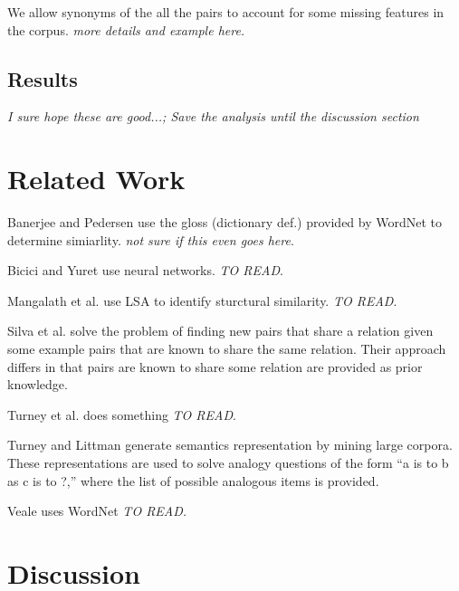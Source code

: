 \documentclass[11pt]{article}
\begin{document}
We allow synonyms of the all the pairs to account for some missing features in
the corpus.  \emph{more details and example here.}

\subsection{Results}

\emph{I sure hope these are good...; Save the analysis until the discussion
  section}

\section{Related Work}

Banerjee and Pedersen\cite{banerjee03extendedgloss} use the gloss (dictionary
def.) provided by WordNet to determine simiarlity.  \emph{not sure if this even
  goes here}.

Bicici and Yuret \cite{bicici06clustering} use neural networks. \emph{TO READ}.

Mangalath et al. \cite{mangalath04analogy} use LSA to identify sturctural
similarity. \emph{TO READ}.

Silva et al. \cite{silva07analogical} solve the problem of finding new pairs
that share a relation given some example pairs that are known to share the same
relation.  Their approach differs in that pairs are known to share some relation
are provided as prior knowledge.

Turney et al. \cite{turney03combining} does something \emph{TO READ}.

Turney and Littman\cite{turney05corpus} generate semantics representation by
mining large corpora.  These representations are used to solve analogy questions of
the form ``a is to b as c is to ?,'' where the list of possible analogous items
is provided.

Veale \cite{veale04wordnet} uses WordNet \emph{TO READ.}

\section{Discussion}
\end{document}
